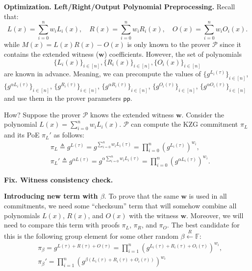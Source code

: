 \documentclass[../lecture-notes-148x210.tex]{subfiles}
\begin{document}
\textcolor{blue!75!gray}{\textbf{Optimization. Left/Right/Output Polynomial Preprocessing.}} Recall that:
\begin{equation*}
    L(x) = \sum_{i=0}^n w_iL_i(x), \quad R(x) = \sum_{i=0}^n w_i R_i(x), \quad O(x) = \sum_{i=0}^n w_iO_i(x).
\end{equation*}
while $M(x) = L(x)R(x) - O(x)$ is only known to the prover $\mathcal{P}$ since it contains the extended witness ($\mathbf{w}$) coefficients. However, the set of polynomials
\begin{equation*}
    \{L_i(x)\}_{i \in [n]}, \{R_i(x)\}_{i \in [n]}, \{O_i(x)\}_{i \in [n]}
\end{equation*}
are known in advance. Meaning, we can precompute the values of $\{g^{L_i(\tau)}\}_{i \in [n]}$, $\{g^{\alpha L_i(\tau)}\}_{i \in [n]}$, $\{g^{R_i(\tau)}\}_{i \in [n]}$, $\{g^{\alpha R_i(\tau)}\}_{i \in [n]}$, $\{g^{O_i(\tau)}\}_{i \in [n]}$, $\{g^{\alpha O_i(\tau)}\}_{i \in [n]}$ and use them in the prover parameters $\mathsf{pp}$.

How? Suppose the prover $\mathcal{P}$ knows the extended witness $\mathbf{w}$. Consider the polynomial $L(x) = \sum_{i=0}^n w_iL_i(x)$. $\mathcal{P}$ can compute the KZG commitment $\pi_L$ and its PoE $\pi_L'$ as follows:
\begin{equation*}
    \begin{aligned}
        &\pi_L \triangleq g^{L(\tau)} = g^{\sum_{i=0}^n w_iL_i(\tau)} = \prod_{i=0}^n (g^{L_i(\tau)})^{w_i}, \\
        &\pi_L' \triangleq g^{\alpha L(\tau)} = g^{\alpha \sum_{i=0}^n w_iL_i(\tau)} = \prod_{i=0}^n (g^{\alpha L_i(\tau)})^{w_i}.        
    \end{aligned}
\end{equation*}

\textcolor{green!50!black}{\textbf{Fix. Witness consistency check.}} 

\textbf{Introducing new term with $\beta$}. To prove that the same $\mathbf{w}$ is used in all commitments, we need some ``checksum'' term that will somehow combine all polynomials $L(x)$, $R(x)$, and $O(x)$ with the witness $\mathbf{w}$. Moreover, we will need to compare this term with proofs $\pi_L$, $\pi_R$, and $\pi_O$. The best candidate for this is the following group element for some other random $\beta \xleftarrow{R} \mathbb{F}$:
\begin{equation*}
    \begin{aligned}
        &\pi_{\beta} = g^{L(\tau) + R(\tau) + O(\tau)} = \prod_{i=1}^n (g^{L_i(\tau) + R_i(\tau) + O_i(\tau)})^{w_i}, \\ 
        &\pi_{\beta}' = \prod_{i=1}^n (g^{\beta(L_i(\tau) + R_i(\tau) + O_i(\tau))})^{w_i}        
    \end{aligned}
\end{equation*}
\end{document}
